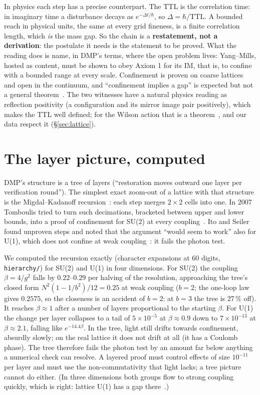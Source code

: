 \documentclass[11pt,a4paper]{article}
\newcommand{\lean}[1]{\texttt{#1}}
\begin{document}
In physics each step has a precise counterpart. The TTL is the correlation time: in imaginary time a disturbance decays as
$e^{-\Delta t/\hbar}$, so $\Delta=\hbar/\mathrm{TTL}$. A bounded reach in physical units, the same at every grid fineness, is a finite
correlation length, which \emph{is} the mass gap. So the chain is a \textbf{restatement, not a derivation}: the postulate it needs is the
statement to be proved. What the reading does is name, in DMP's terms, where the open problem lives: Yang--Mills, hosted as content, must be
shown to obey Axiom 1 for its IM, that is, to confine with a bounded range at every scale. Confinement is proven on coarse
lattices~\cite{os78,cns25} and open in the continuum, and ``confinement implies a gap'' is expected but not a general
theorem~\cite{jaffewitten}. The two witnesses have a natural physics reading as reflection positivity (a configuration and its mirror image
pair positively), which makes the TTL well defined; for the Wilson action that is a theorem~\cite{os78}, and our data respect it
(\S\ref{sec:lattice}).

\section{The layer picture, computed}\label{sec:layers}

DMP's structure is a tree of layers (``restoration moves outward one layer per verification round''). The simplest exact zoom-out of a
lattice with that structure is the Migdal--Kadanoff recursion~\cite{migdal,kadanoff}: each step merges $2\times2$ cells into one. In 2007
Tomboulis tried to turn such decimations, bracketed between upper and lower bounds, into a proof of confinement for SU(2) at every
coupling~\cite{tomboulis}. Ito and Seiler found unproven steps and noted that the argument ``would seem to work'' also for U(1), which does
not confine at weak coupling~\cite{itoseiler}: it fails the photon test.

We computed the recursion exactly (character expansions at 60 digits, \lean{hierarchy/}) for SU(2) and U(1) in four dimensions. For SU(2) the
coupling $\beta=4/g^2$ falls by $0.22$--$0.29$ per halving of the resolution, approaching the tree's closed form $N^2(1-1/b^2)/12=0.25$ at
weak coupling ($b=2$; the one-loop law gives $0.2575$, so the closeness is an accident of $b=2$: at $b=3$ the tree is 27\,\% off). It
reaches $\beta\approx1$ after a number of layers proportional to the starting $\beta$. For U(1) the change per layer collapses to a tail of
$5\times10^{-5}$ at $\beta\approx0.9$ down to $7\times10^{-13}$ at $\beta\approx2.1$, falling like $e^{-14.4\beta}$. In the tree, light still
drifts towards confinement, absurdly slowly; on the real lattice it does not drift at all (it has a Coulomb phase). The tree therefore fails
the photon test by an amount far below anything a numerical check can resolve. A layered proof must control effects of size $10^{-11}$ per
layer and must use the non-commutativity that light lacks; a tree picture cannot do either. (In three dimensions both groups flow to strong
coupling quickly, which is right: lattice U(1) has a gap there~\cite{gm82}.)
\end{document}
